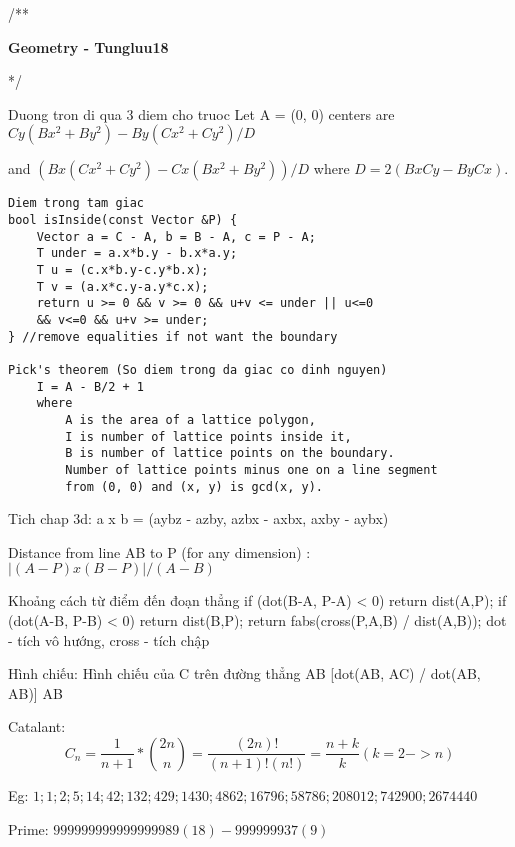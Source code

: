 /**

 \textbf{Geometry - Tungluu18}

 */
 
Duong tron di qua 3 diem cho truoc
	Let A = (0, 0) centers are 
	$Cy(Bx^2 + By^2) - By(Cx^2 + Cy^2)/D$
  
		and
	$(Bx(Cx^2 + Cy^2) - Cx(Bx^2 + By^2))/D$
		where 
	$D = 2(BxCy - ByCx).$
 
 \begin{lstlisting}
Diem trong tam giac
bool isInside(const Vector &P) {
	Vector a = C - A, b = B - A, c = P - A;
	T under = a.x*b.y - b.x*a.y;
	T u = (c.x*b.y-c.y*b.x);
	T v = (a.x*c.y-a.y*c.x);
	return u >= 0 && v >= 0 && u+v <= under || u<=0 
	&& v<=0 && u+v >= under;
} //remove equalities if not want the boundary
 
Pick's theorem (So diem trong da giac co dinh nguyen) 
	I = A - B/2 + 1
	where 
		A is the area of a lattice polygon,
		I is number of lattice points inside it,
		B is number of lattice points on the boundary.
		Number of lattice points minus one on a line segment 
		from (0, 0) and (x, y) is gcd(x, y).
 \end{lstlisting}
 
Tich chap 3d: a x b = (aybz - azby, azbx - axbx, axby - aybx)
 
Distance from line AB to P (for any dimension) : $|(A - P) x (B - P)| / (A - B)$
 
Khoảng cách từ điểm đến đoạn thẳng
	if (dot(B-A, P-A) < 0) return dist(A,P);
	if (dot(A-B, P-B) < 0) return dist(B,P);
	return fabs(cross(P,A,B) / dist(A,B));
	dot - tích vô hướng, cross - tích chập
 
Hình chiếu:
	Hình chiếu của C trên đường thẳng AB [dot(AB, AC) / dot(AB, AB)] AB
 
 
Catalant:
\[
	C_n = \frac{1}{n+1} * \binom{2n}{n} = \frac{(2n)!}{(n+1)!(n!)} = \frac{n+k}{k} (k = 2 -> n)	
\]

Eg: $1; 1; 2; 5; 14; 42; 132; 429; 1430; 4862; 16796; 58786; 208012; 742900; 2674440$

Prime: $999999999999999989 (18) - 999999937(9)$

